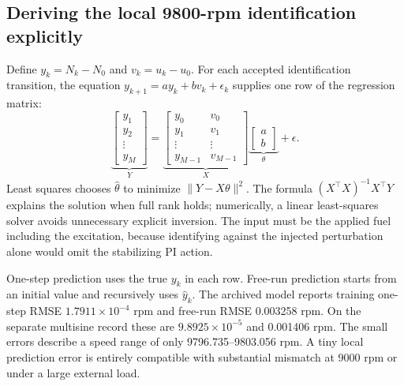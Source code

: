 \subsection{Deriving the local 9800-rpm identification explicitly}
Define $y_k=N_k-N_0$ and $v_k=u_k-u_0$. For each accepted identification transition, the equation $y_{k+1}=ay_k+bv_k+\epsilon_k$ supplies one row of the regression matrix:
\begin{equation}
\underbrace{\begin{bmatrix}y_1\\y_2\\\vdots\\y_M\end{bmatrix}}_{Y}
=\underbrace{\begin{bmatrix}y_0&v_0\\y_1&v_1\\\vdots&\vdots\\y_{M-1}&v_{M-1}\end{bmatrix}}_{X}
\underbrace{\begin{bmatrix}a\\b\end{bmatrix}}_{\theta}+\epsilon.
\end{equation}
Least squares chooses $\hat\theta$ to minimize $\|Y-X\theta\|^2$. The formula $(X^\top X)^{-1}X^\top Y$ explains the solution when full rank holds; numerically, a linear least-squares solver avoids unnecessary explicit inversion. The input must be the applied fuel including the excitation, because identifying against the injected perturbation alone would omit the stabilizing PI action.

One-step prediction uses the true $y_k$ in each row. Free-run prediction starts from an initial value and recursively uses $\hat y_k$. The archived model reports training one-step RMSE $1.7911\times10^{-4}$ rpm and free-run RMSE 0.003258 rpm. On the separate multisine record these are $9.8925\times10^{-5}$ and 0.001406 rpm. The small errors describe a speed range of only 9796.735--9803.056 rpm. A tiny local prediction error is entirely compatible with substantial mismatch at 9000 rpm or under a large external load.

